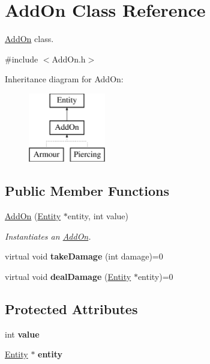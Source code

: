 \hypertarget{classAddOn}{}\section{Add\+On Class Reference}
\label{classAddOn}


\hyperlink{classAddOn}{Add\+On} class.  




{\ttfamily \#include $<$Add\+On.\+h$>$}

Inheritance diagram for Add\+On\+:\begin{figure}[H]
\begin{center}
\leavevmode
\includegraphics[height=3.000000cm]{classAddOn}
\end{center}
\end{figure}
\subsection*{Public Member Functions}
\begin{DoxyCompactItemize}
\item 
\hyperlink{classAddOn_abb1bfa4bf3040a25a5933ad956c165c9}{Add\+On} (\hyperlink{classEntity}{Entity} $\ast$entity, int value)
\begin{DoxyCompactList}\small\item\em Instantiates an \hyperlink{classAddOn}{Add\+On}. \end{DoxyCompactList}\item 
\mbox{\label{classAddOn_ab3aefbc00969fe613ed6d42c4f55c5a2}} 
virtual void {\bfseries take\+Damage} (int damage)=0
\item 
\mbox{\label{classAddOn_aff1f4fa0fb368bbc49838df9c9ddba9c}} 
virtual void {\bfseries deal\+Damage} (\hyperlink{classEntity}{Entity} $\ast$entity)=0
\end{DoxyCompactItemize}
\subsection*{Protected Attributes}
\begin{DoxyCompactItemize}
\item 
\mbox{\label{classAddOn_a5c051eef3f3e8200d5a48cfc50174f91}} 
int {\bfseries value}
\item 
\mbox{\label{classAddOn_aaa321002131799f305663626784e364e}} 
\hyperlink{classEntity}{Entity} $\ast$ {\bfseries entity}
\end{DoxyCompactItemize}


